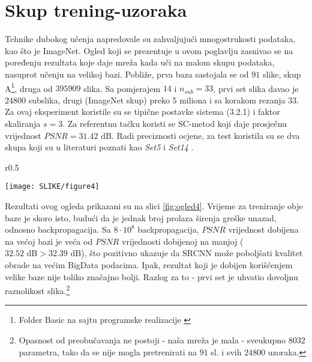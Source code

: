 \documentclass[12pt]{report}
\numberwithin{equation}{section}
\begin{document}
  \section{Skup trening-uzoraka}


  
  Tehnike dubokog učenja napredovale su zahvaljujući mnogostrukosti podataka, kao što je ImageNet. Ogled koji se prezentuje u ovom poglavlju zasnivao se na poređenju rezultata koje daje mreža kada uči na malom skupu podataka, nasuprot učenju na velikoj bazi. Pobliže, prva baza sastojala se od $91$ slike, skup A\footnote{Folder Basic na sajtu programske realizacije \cite{samples}}, druga od $395 909$ slika. Sa pomjerajem $14$ i $n_{sub}=33$, prvi set slika davao je $24 800$ subslika, drugi (ImageNet skup) preko $5$ miliona i sa korakom rezanja $33$. Za ovaj eksperiment koristile su se tipične postavke sistema (3.2.1) i faktor skaliranja $s = 3$. Za referentnu tačku koristi se SC-metod \cite{sparse1} koji daje prosječnu vrijednost $PSNR = 31.42\text{ dB}$.  Radi preciznosti ocjene, za test koristila su se dva skupa koji su u literaturi poznati kao \textit{Set5} i \textit{Set14} \cite{samples}.

    \begin{wrapfigure}{r}{0.5\textwidth} 
  \begin{center}
    \texttt{[image: SLIKE/figure4]}
  \end{center}
  \caption{Treniranje na većoj bazi popravlja performanse}
  \label{fig:ogled4}
\end{wrapfigure}
Rezultati ovog ogleda prikazani su na slici \ref{fig:ogled4}. Vrijeme za treniranje obje baze je skoro isto, budući da je jednak broj prolaza širenja greške unazad, odnosno backpropagacija. Sa $8 \cdot 10^8$ backpropagacija, $PSNR$ vrijednost dobijena na većoj bazi je veća od $PSNR$ vrijednosti dobijenoj na manjoj ($32.52 \text{ dB} > 32.39 \text{ dB}$), što pozitivno ukazuje da SRCNN može poboljšati kvalitet obrade na većim BigData podacima. Ipak, rezultat koji je dobijen korišćenjem velike baze nije toliko značajno bolji. Razlog za to - prvi set je uhvatio dovoljnu raznolikost slika.\footnote{Opasnost od preobučavanja ne postoji - naša mreža je mala - sveukupno $8 032$ parametra, tako da se nije mogla pretrenirati na $91$ sl. i svih $24 800$ uzoraka.} 
    
  
\end{document}
